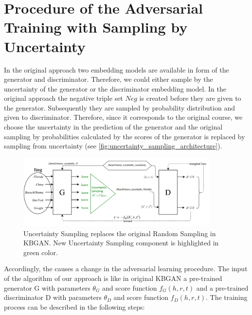 \section{Procedure of the Adversarial Training with Sampling by Uncertainty}
\label{sec:procedure}
In the original \kbgan approach two embedding models are available in form of the generator and discriminator.
Therefore, we could either sample by the uncertainty of the generator or the discriminator embedding model.
In the original \kban approach the negative triple set $Neg$ is created before they are given to the generator.
Subsequently they are sampled by probability distribution and given to discriminator.
Therefore, since it corresponds to the original course, we choose the uncertainty in the prediction of the generator and the original sampling by probabilities calculated by the scores of the generator is replaced by sampling from uncertainty (see \autoref{fig:uncertainty_sampling_architecture}).
\begin{figure}[t]
  \centering
    \includegraphics[width=0.90\textwidth]{figures/architecture.png}
  \caption{Uncertainty Sampling replaces the original Random Sampling in \ac{KBGAN}. 
  New Uncertainty Sampling component is highlighted in green color.}
  \label{fig:uncertainty_sampling_architecture}
\end{figure}
Accordingly, the causes a change in the adversarial learning procedure.
The input of the algorithm of our approach is like in original \ac{KBGAN} a pre-trained generator G with parameters $\theta_G$ and score function $f_G(h,r,t)$ and a pre-trained discriminator D with parameters $\theta_D$ and score function $f_D(h,r,t)$.
The training process can be described in the following steps:
